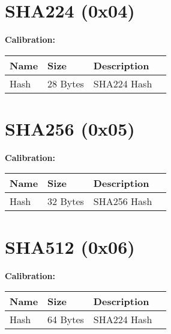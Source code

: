 \documentclass[11pt]{article}
\begin{document}
\section{SHA224 (0x04)}
\textbf{Calibration:}


\begin{center}
\begin{tabular}{ |l|l|l|l| } 
\hline
\textbf{Name} & \textbf{Size} & \textbf{Description}\\
\hline
Hash & 28 Bytes & SHA224 Hash\\   
\hline
\end{tabular}
\end{center}

\section{SHA256 (0x05)}
\textbf{Calibration:}


\begin{center}
\begin{tabular}{ |l|l|l|l| } 
\hline
\textbf{Name} & \textbf{Size} & \textbf{Description}\\
\hline
Hash & 32 Bytes & SHA256 Hash\\   
\hline
\end{tabular}
\end{center}

\section{SHA512 (0x06)}
\textbf{Calibration:}


\begin{center}
\begin{tabular}{ |l|l|l|l| } 
\hline
\textbf{Name} & \textbf{Size} & \textbf{Description}\\
\hline
Hash & 64 Bytes & SHA224 Hash\\   
\hline
\end{tabular}
\end{center}
\end{document}
